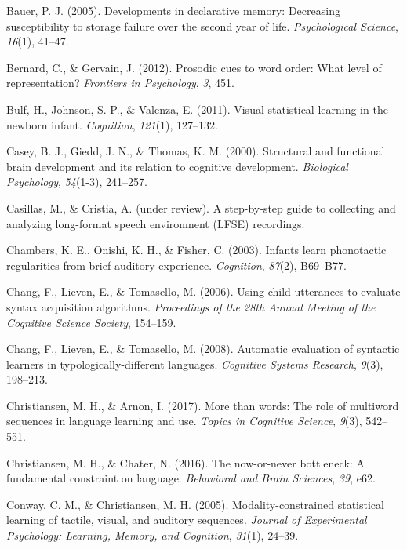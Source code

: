 \documentclass[man,mask,floatsintext]{apa6}
\theoremstyle{definition}
\theoremstyle{definition}
\theoremstyle{definition}
\theoremstyle{remark}
\begin{document}
\hypertarget{ref-bauer2005developments}{}
Bauer, P. J. (2005). Developments in declarative memory: Decreasing
susceptibility to storage failure over the second year of life.
\emph{Psychological Science}, \emph{16}(1), 41--47.

\hypertarget{ref-bernard2012prosodic}{}
Bernard, C., \& Gervain, J. (2012). Prosodic cues to word order: What
level of representation? \emph{Frontiers in Psychology}, \emph{3}, 451.

\hypertarget{ref-bulf2011visual}{}
Bulf, H., Johnson, S. P., \& Valenza, E. (2011). Visual statistical
learning in the newborn infant. \emph{Cognition}, \emph{121}(1),
127--132.

\hypertarget{ref-casey2000structural}{}
Casey, B. J., Giedd, J. N., \& Thomas, K. M. (2000). Structural and
functional brain development and its relation to cognitive development.
\emph{Biological Psychology}, \emph{54}(1-3), 241--257.

\hypertarget{ref-casillasURstep}{}
Casillas, M., \& Cristia, A. (under review). A step-by-step guide to
collecting and analyzing long-format speech environment (LFSE)
recordings.

\hypertarget{ref-chambers2003infants}{}
Chambers, K. E., Onishi, K. H., \& Fisher, C. (2003). Infants learn
phonotactic regularities from brief auditory experience.
\emph{Cognition}, \emph{87}(2), B69--B77.

\hypertarget{ref-chang2006using}{}
Chang, F., Lieven, E., \& Tomasello, M. (2006). Using child utterances
to evaluate syntax acquisition algorithms. \emph{Proceedings of the 28th
Annual Meeting of the Cognitive Science Society}, 154--159.

\hypertarget{ref-chang2008automatic}{}
Chang, F., Lieven, E., \& Tomasello, M. (2008). Automatic evaluation of
syntactic learners in typologically-different languages. \emph{Cognitive
Systems Research}, \emph{9}(3), 198--213.

\hypertarget{ref-christiansen2017more}{}
Christiansen, M. H., \& Arnon, I. (2017). More than words: The role of
multiword sequences in language learning and use. \emph{Topics in
Cognitive Science}, \emph{9}(3), 542--551.

\hypertarget{ref-christiansen2016now}{}
Christiansen, M. H., \& Chater, N. (2016). The now-or-never bottleneck:
A fundamental constraint on language. \emph{Behavioral and Brain
Sciences}, \emph{39}, e62.

\hypertarget{ref-conway2005modality}{}
Conway, C. M., \& Christiansen, M. H. (2005). Modality-constrained
statistical learning of tactile, visual, and auditory sequences.
\emph{Journal of Experimental Psychology: Learning, Memory, and
Cognition}, \emph{31}(1), 24--39.
\end{document}
